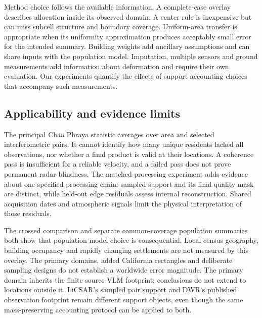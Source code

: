 \documentclass[pdflatex,sn-nature]{sn-jnl}
\begin{document}
Method choice follows the available information. A complete-case overlay describes allocation inside its observed domain. A center rule is inexpensive but can miss subcell structure and boundary coverage. Uniform-area transfer is appropriate when its uniformity approximation produces acceptably small error for the intended summary. Building weights add ancillary assumptions and can share inputs with the population model. Imputation, multiple sensors and ground measurements add information about deformation and require their own evaluation. Our experiments quantify the effects of support accounting choices that accompany such measurements.

\subsection{Applicability and evidence limits}
The principal Chao Phraya statistic averages over area and selected interferometric pairs. It cannot identify how many unique residents lacked all observations, nor whether a final product is valid at their locations. A coherence pass is insufficient for a reliable velocity, and a failed pass does not prove permanent radar blindness. The matched processing experiment adds evidence about one specified processing chain: sampled support and its final quality mask are distinct, while held-out edge residuals assess internal reconstruction. Shared acquisition dates and atmospheric signals limit the physical interpretation of those residuals.

The crossed comparison and separate common-coverage population summaries both show that population-model choice is consequential. Local census geography, building occupancy and rapidly changing settlements are not measured by this overlay. The primary domains, added California rectangles and deliberate sampling designs do not establish a worldwide error magnitude. The primary domain inherits the finite source-VLM footprint; conclusions do not extend to locations outside it. LiCSAR's sampled pair support and DWR's published observation footprint remain different support objects, even though the same mass-preserving accounting protocol can be applied to both.
\end{document}
